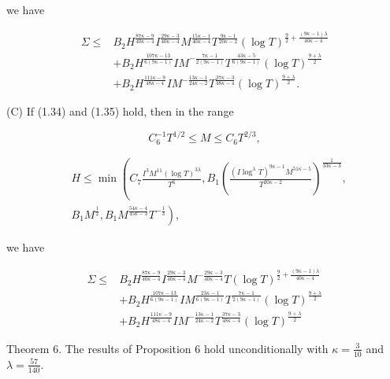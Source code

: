 \documentclass[10pt]{article}
\begin{document}
we have


\begin{align*}
\Sigma \leqslant & B_{2} H^{\frac{87 \kappa-9}{40 \kappa-4}} I^{\frac{29 \kappa-3}{40 \kappa-4}} M^{\frac{15 \kappa-1}{40 \kappa-4}} T^{\frac{9 \kappa-1}{20 \kappa-2}}(\log T)^{\frac{9}{2}+\frac{(9 \kappa-1)\lambda}{40 \kappa-4}} \\
& +B_{2} H^{\frac{107 \kappa-13}{6(9 \kappa-1)}} I M^{-\frac{7 \kappa-1}{2(9 \kappa-1)}} T^{\frac{43 \kappa-5}{6(9 \kappa-1)}}(\log T)^{\frac{9+\lambda}{2}} \\
& +B_{2} H^{\frac{111 \kappa-9}{48 \kappa-4}} I M^{-\frac{13 \kappa-1}{24 \kappa-2}} T^{\frac{37 \kappa-3}{48 \kappa-4}}(\log T)^{\frac{9+\lambda}{2}}. \tag{1.41}
\end{align*}


(C) If (1.34) and (1.35) hold, then in the range


\begin{equation*}
C_{6}^{-1} T^{1 / 2} \leqslant M \leqslant C_{6} T^{2 / 3}, \tag{1.42}
\end{equation*}



\begin{align*}
& H \leqslant \min \left(C_{7} \frac{I^{3} M^{11}(\log T)^{3 \lambda}}{T^{6}}, B_{1}\left(\frac{\left(I \log ^{\lambda} T\right)^{9 \kappa-1} M^{51 \kappa-5}}{T^{20 \kappa-2}}\right)^{\frac{1}{33 \kappa-3}},\right. \\
&\left.B_{1} M^{\frac{1}{2}}, B_{1} M^{\frac{54 \kappa-4}{45 \kappa-3}} T^{-\frac{1}{3}}\right), \tag{1.43}
\end{align*}


we have


\begin{align*}
\Sigma \leqslant & B_{2} H^{\frac{87 \kappa-9}{40 \kappa-4}} I^{\frac{29 \kappa-3}{40 \kappa-4}} M^{-\frac{29 \kappa-3}{40 \kappa-4}} T(\log T)^{\frac{9}{2}+\frac{(9 \kappa-1)\lambda}{40 \kappa-4}} \\
& +B_{2} H^{\frac{107 \kappa-13}{6(9 \kappa-1)}} I M^{\frac{23 \kappa-1}{6(9 \kappa-1)}} T^{\frac{7 \kappa-1}{2(9 \kappa-1)}}(\log T)^{\frac{9+\lambda}{2}} \\
& +B_{2} H^{\frac{111 \kappa-9}{48 \kappa-4}} I M^{-\frac{13 \kappa-1}{24 \kappa-2}} T^{\frac{37 \kappa-3}{48 \kappa-4}}(\log T)^{\frac{9+\lambda}{2}} \tag{1.44}
\end{align*}


Theorem 6. The results of Proposition 6 hold unconditionally with $\kappa=\frac{3}{10}$ and $\lambda=\frac{57}{140}$.
\end{document}
